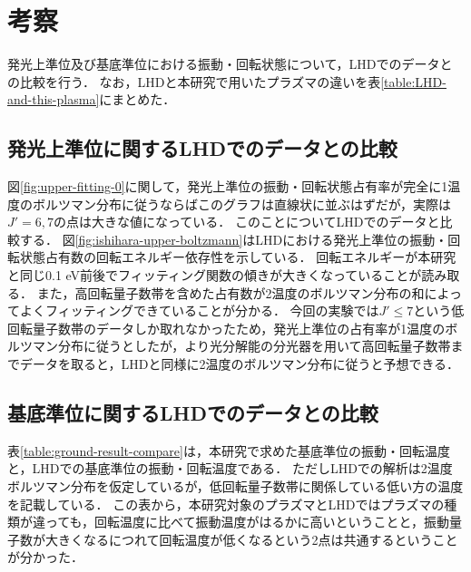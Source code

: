 \chapter{考察}
発光上準位及び基底準位における振動・回転状態について，LHDでのデータとの比較を行う．
なお，LHDと本研究で用いたプラズマの違いを表\ref{table:LHD-and-this-plasma}にまとめた\cite{ishihara}．

\section{発光上準位に関するLHDでのデータとの比較}
図\ref{fig:upper-fitting-0}に関して，発光上準位の振動・回転状態占有率が完全に1温度のボルツマン分布に従うならばこのグラフは直線状に並ぶはずだが，実際は$J'=6,7$の点は大きな値になっている．
このことについてLHDでのデータと比較する．
図\ref{fig:ishihara-upper-boltzmann}はLHDにおける発光上準位の振動・回転状態占有数の回転エネルギー依存性を示している\cite{ishihara}．
回転エネルギーが本研究と同じ0.1 eV前後でフィッティング関数の傾きが大きくなっていることが読み取る．
また，高回転量子数帯を含めた占有数が2温度のボルツマン分布の和によってよくフィッティングできていることが分かる．
今回の実験では$J' \leq 7$という低回転量子数帯のデータしか取れなかったため，発光上準位の占有率が1温度のボルツマン分布に従うとしたが，より光分解能の分光器を用いて高回転量子数帯までデータを取ると，LHDと同様に2温度のボルツマン分布に従うと予想できる．

\section{基底準位に関するLHDでのデータとの比較}
表\ref{table:ground-result-compare}は，本研究で求めた基底準位の振動・回転温度と，LHDでの基底準位の振動・回転温度\cite{ishihara}である．
ただしLHDでの解析は2温度ボルツマン分布を仮定しているが，低回転量子数帯に関係している低い方の温度を記載している．
この表から，本研究対象のプラズマとLHDではプラズマの種類が違っても，回転温度に比べて振動温度がはるかに高いということと，振動量子数が大きくなるにつれて回転温度が低くなるという2点は共通するということが分かった．

\begin{comment}
図\ref{fig:upper-fitting-0}に関して，発光上準位の振動・回転状態占有率が完全にボルツマン分布に従うとするとこのグラフは直線になるはずだが，実際は$v'=0$の$J'=6,7$の点は大きな値になっている．
このことから，回転温度は視線方向に一定ではないことが考えられる．
高回転量子数域を含めた発光上準位の占有数のボルツマンプロットが直線から外れることは，他のプラズマでも報告されている．
図\ref{fig:ishihara-upper-boltzmann}は，岐阜県土岐市の核融合科学研究所にある大型ヘリカル装置(LHD)でのプラズマにおける，発光上準位における占有数のボルツマンプロットである\cite{ishihara}．
図中の点線は高低2温度のボルツマン分布を仮定したフィッティング結果であり，良く近似できていることが分かる．
また，発光上準位の占有数分布が2温度のボルツマン分布で良く近似できることは，放電の種類に関わらず複数計測されている\cite{ishihara, two-temperature-1, two-temperature-2}．
本研究の対称としたプラズマでも，より光分解能の分光器を用いて高回転量子数域までデータを取り，2温度のボルツマン分布を仮定することで，正確な占有率を計算することができると考えられる．
\end{comment}